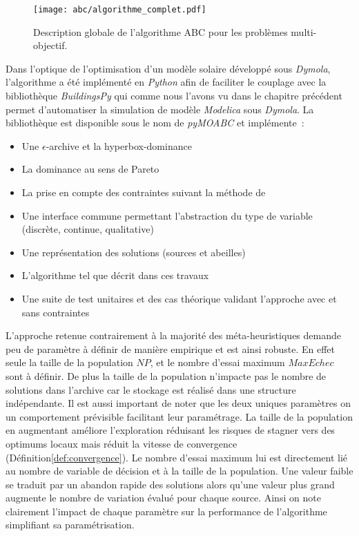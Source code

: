 \begin{figure}
    \begin{center}
        \texttt{[image: abc/algorithme\_complet.pdf]}
    \end{center}
    \caption{Description globale de l’algorithme ABC pour les problèmes multi-objectif.
             \label{fig:abc_complet}}
\end{figure}

Dans l’optique de l’optimisation d’un modèle solaire développé sous \textit{Dymola}, l’algorithme
a été implémenté en \textit{Python} afin de faciliter le couplage avec la bibliothèque
\textit{BuildingsPy} qui comme nous l’avons vu dans le chapitre précédent permet d’automatiser
la simulation de modèle \textit{Modelica} sous \textit{Dymola}. La bibliothèque est
disponible sous le nom de \textit{pyMOABC} et implémente~:
\begin{itemize}
  \item Une $\epsilon$-archive et la hyperbox-dominance
  \item La dominance au sens de Pareto
  \item La prise en compte des contraintes suivant la méthode de \cite{Woldesenbet20073077}
  \item Une interface commune permettant l’abstraction du type de variable (discrète, continue, qualitative)
  \item Une représentation des solutions (sources et abeilles)
  \item L’algorithme tel que décrit dans ces travaux
  \item Une suite de test unitaires et des cas théorique validant l’approche avec
        et sans contraintes
\end{itemize}

L’approche retenue contrairement à la majorité des méta-heuristiques demande
peu de paramètre à définir de manière empirique et est ainsi robuste. En effet
seule la taille de la population $NP$, et le nombre d’essai maximum $MaxEchec$ sont à définir.
De plus la taille de la population n’impacte pas le nombre de solutions dans l’archive
car le stockage est réalisé dans une structure indépendante. Il est aussi important
de noter que les deux uniques paramètres on un comportement prévisible facilitant
leur paramétrage. La taille de la population en augmentant améliore l’exploration
réduisant les risques de stagner vers des optimums locaux mais réduit la vitesse
de convergence (Définition\ref{def:convergence}).
Le nombre d’essai maximum lui est directement lié au nombre de variable de décision
et à la taille de la population. Une valeur faible se traduit par un abandon rapide
des solutions alors qu’une valeur plus grand augmente le nombre de variation évalué
pour chaque source. Ainsi on note clairement l’impact de chaque paramètre sur la
performance de l’algorithme simplifiant sa paramétrisation.

